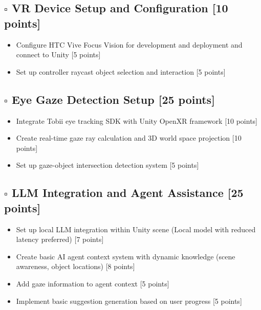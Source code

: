 \documentclass[12pt,letterpaper]{article}
\newcommand{\taskbox}{$\square$}
\begin{document}
\subsection{\taskbox \hspace{0.2cm} VR Device Setup and Configuration \hfill {\color{successgreen}\bfseries [10 points]}}

\begin{itemize}[leftmargin=1cm, itemsep=0.3cm]
    \item[\taskbox] Configure HTC Vive Focus Vision for development and deployment and connect to Unity \hfill {\small [5 points]}
    \item[\taskbox] Set up controller raycast object selection and interaction \hfill {\small [5 points]}
\end{itemize}


\subsection{\taskbox \hspace{0.2cm} Eye Gaze Detection Setup \hfill {\color{successgreen}\bfseries [25 points]}}

\begin{itemize}[leftmargin=1cm, itemsep=0.3cm]
    \item[\taskbox] Integrate Tobii eye tracking SDK with Unity OpenXR framework \hfill {\small [10 points]}
    \item[\taskbox] Create real-time gaze ray calculation and 3D world space projection \hfill {\small [10 points]}
    \item[\taskbox] Set up gaze-object intersection detection system \hfill {\small [5 points]}
\end{itemize}

\subsection{\taskbox \hspace{0.2cm} LLM Integration and Agent Assistance \hfill {\color{successgreen}\bfseries [25 points]}}

\begin{itemize}[leftmargin=1cm, itemsep=0.3cm]
    \item[\taskbox] Set up local LLM integration within Unity scene (Local model with reduced latency preferred) \hfill {\small [7 points]}
    \item[\taskbox] Create basic AI agent context system with dynamic knowledge (scene awareness, object locations) \hfill {\small [8 points]}
    \item[\taskbox] Add gaze information to agent context \hfill {\small [5 points]}
    \item[\taskbox] Implement basic suggestion generation based on user progress \hfill {\small [5 points]}
\end{itemize}
\end{document}
